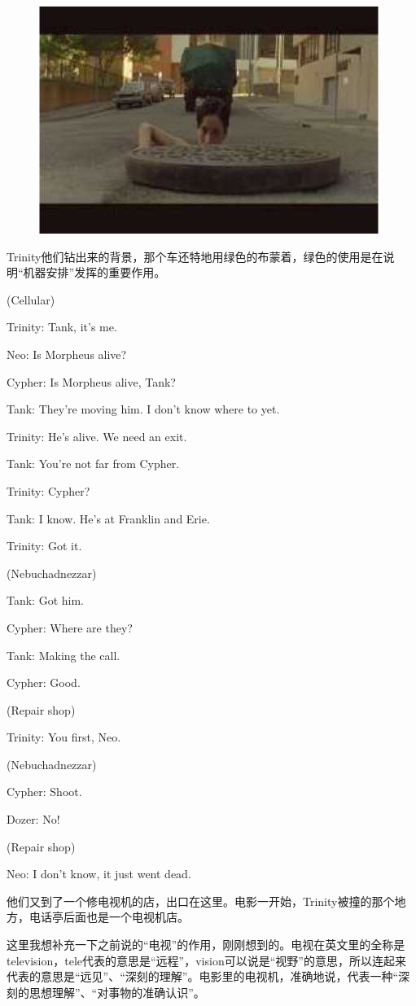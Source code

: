 \documentclass{ctexart}
\newenvironment{myquote}{\color{green} \setlength{\leftskip}{6em} \setlength{\rightskip}{4em} \setlength{\parindent}{-2em}}{\par}
\begin{document}
\begin{figure}[htb]
\centering
\includegraphics[width=0.5\linewidth]{fig/read_Matrix-58}
\end{figure}

Trinity他们钻出来的背景，那个车还特地用绿色的布蒙着，绿色的使用是在说明“机器安排”发挥的重要作用。

\begin{myquote}
(Cellular)

Trinity: Tank, it's me.

Neo: Is Morpheus alive?

Cypher: Is Morpheus alive, Tank?

Tank: They're moving him. I don't know where to yet.

Trinity: He's alive. We need an exit.

Tank: You're not far from Cypher.

Trinity: Cypher?

Tank: I know. He's at Franklin and Erie.

Trinity: Got it.

(Nebuchadnezzar)

Tank: Got him.

Cypher: Where are they?

Tank: Making the call.

Cypher: Good.

(Repair shop)

Trinity: You first, Neo.

(Nebuchadnezzar)

Cypher: Shoot.

Dozer: No!

(Repair shop)

Neo: I don't know, it just went dead.
\end{myquote}

他们又到了一个修电视机的店，出口在这里。电影一开始，Trinity被撞的那个地方，电话亭后面也是一个电视机店。

这里我想补充一下之前说的“电视”的作用，刚刚想到的。电视在英文里的全称是television，tele代表的意思是“远程”，vision可以说是“视野”的意思，所以连起来代表的意思是“远见”、“深刻的理解”。电影里的电视机，准确地说，代表一种“深刻的思想理解”、“对事物的准确认识”。
\end{document}
